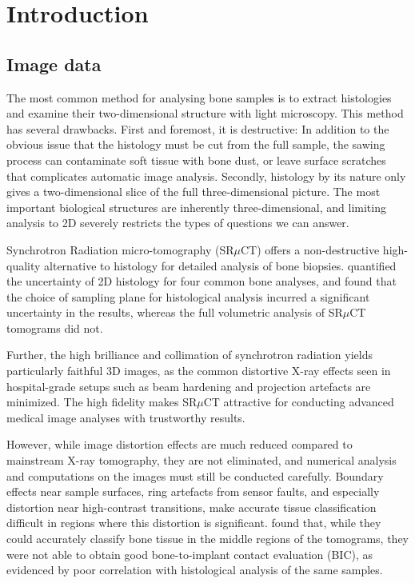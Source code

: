 \section{Introduction}
\label{sec:intro}


\subsection{Image data}

The most common method for analysing bone samples is to extract histologies and examine their
two-dimensional structure with light microscopy. This method has several drawbacks. First and
foremost, it is destructive: In addition to the obvious issue that the histology must be cut
from the full sample, the sawing process can contaminate soft tissue with bone dust, or leave
surface scratches that complicates automatic image analysis. Secondly, histology by its nature
only gives a two-dimensional slice of the full three-dimensional picture. The most important
biological structures are inherently three-dimensional, and limiting analysis to 2D severely
restricts the types of questions we can answer.

Synchrotron Radiation micro-tomography (SR$\mu$CT) offers a non-destructive high-quality
alternative to histology for detailed analysis of bone biopsies. \cite{torsten2018}
quantified the uncertainty of 2D histology for four common bone analyses, and found that the
choice of sampling plane for histological analysis incurred a significant uncertainty in the
results, whereas the full volumetric analysis of SR$\mu$CT tomograms did not.

Further, the high brilliance and collimation of synchrotron radiation yields particularly
faithful 3D images, as the common distortive X-ray effects seen in hospital-grade setups such
as beam hardening and projection artefacts are minimized. The high fidelity makes SR$\mu$CT
attractive for conducting advanced medical image analyses with trustworthy results.

However, while image distortion effects are much reduced compared to mainstream X-ray tomography,
they are not eliminated, and numerical analysis and computations on the images must still be
conducted carefully. Boundary effects near sample surfaces, ring artefacts from sensor faults, and especially
distortion near high-contrast transitions, make accurate tissue classification difficult in
regions where this distortion is significant. \cite{sporring} found that, while
they could accurately classify bone tissue in the middle regions of the tomograms, they were
not able to obtain good bone-to-implant contact evaluation (BIC), as evidenced by poor correlation
with histological analysis of the same samples.


